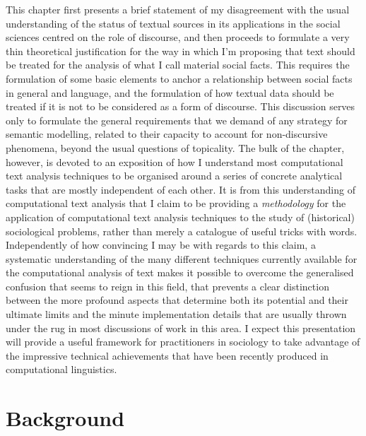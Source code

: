 This chapter first presents a brief statement of my disagreement with the usual understanding of the status of textual sources in its applications in the social sciences centred on the role of discourse, and then proceeds to formulate a very thin theoretical justification for the way in which I'm proposing that text should be treated for the analysis of what I call material social facts.
This requires the formulation of some basic elements to anchor a relationship between social facts in general and language, and the formulation of how textual data should be treated if it is not to be considered as a form of discourse.
This discussion serves only to formulate the general requirements that we demand of any strategy for semantic modelling, related to their capacity to account for non-discursive phenomena, beyond the usual questions of topicality.
The bulk of the chapter, however, is devoted to an exposition of how I understand most computational text analysis techniques to be organised around a series of concrete analytical tasks that are mostly independent of each other.
It is from this understanding of computational text analysis that I claim to be providing a \emph{methodology} for the application of computational text analysis techniques to the study of (historical) sociological problems, rather than merely a catalogue of useful tricks with words.
Independently of how convincing I may be with regards to this claim, a systematic understanding of the many different techniques currently available for the computational analysis of text makes it possible to overcome the generalised confusion that seems to reign in this field, that prevents a clear distinction between the more profound aspects that determine both its potential and their ultimate limits and the minute implementation details that are usually thrown under the rug in most discussions of work in this area.
I expect this presentation will provide a useful framework for practitioners in sociology to take advantage of the impressive technical achievements that have been recently produced in computational linguistics.

\section{Background}
\label{sec:background}

